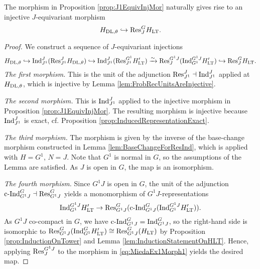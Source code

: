 \documentclass[../main.tex]{subfiles}
\begin{document}
\begin{lem} \label{lem:JEquivInjMor}
  The morphism in Proposition \ref{prop:J1EquivInjMor} naturally gives rise to
  an injective $J$-equivariant morphism
  \begin{equation*}
    H_{\mathrm{DL},\theta} \hookrightarrow \mathrm{Res}_J^G H_{\mathrm{LT}}.
  \end{equation*}
\begin{proof}
  We construct a sequence of $J$-equivariant injections
  \begin{equation*}
    H_{\mathrm{DL},\theta} \hookrightarrow \mathrm{Ind}_{J^1}^J ( \mathrm{Res}_{J^1}^J H_{\mathrm{DL},\theta}) \hookrightarrow
    \mathrm{Ind}_{J^1}^J (\mathrm{Res}_{J^1}^{G^1} H'_{\mathrm{LT}}) \\ \xrightarrow{\sim} \mathrm{Res}_J^{G^1J}(
    \mathrm{Ind}_{G^1}^{G^1J} H'_{\mathrm{LT}}) 
 \hookrightarrow \mathrm{Res}_J^G H_{\mathrm{LT}}.
  \end{equation*}
  \textit{The first morphism.}
  This is the unit of the adjunction $\mathrm{Res}_{J^1}^J \dashv \mathrm{Ind}_{J^1}^J$ 
  applied at $H_{\mathrm{DL},\theta}$, which is injective by Lemma
  \ref{lem:FrobRecUnitsAreInjective}.

  \textit{The second morphism.}
  This is $\mathrm{Ind}_{J^1}^J$ applied to the injective morphism in Proposition
  \ref{prop:J1EquivInjMor}. The resulting morphism is injective because
  $\mathrm{Ind}_{J^1}^J$ is exact, cf. Proposition
  \ref{prop:InducedRepresentationExact}. 

  \textit{The third morphism.} 
  The morphism is given by the inverse of the base-change morphism constructed in
  Lemma \ref{lem:BaseChangeForResInd}, which is applied with $H = G^1$, $N = J$. 
  Note that $G^1$ is normal in $G$, so the assumptions of the Lemma are
  satisfied. As $J$ is open in $G$, the map is an isomorphism. 
  
  \textit{The fourth morphism.}
  Since $G^1J$ is open in $G$, the unit of the adjunction $\mathrm{c\text{-}Ind}_{G^1J}^G \dashv
  \mathrm{Res}_{G^1J}^G$ yields a monomorphism of $G^1J$-representations 
  \begin{equation}\label{eq:MiedaEx1Morph1}
    \mathrm{Ind}_{G^1}^{G^1J} H_{\mathrm{LT}}' \to \mathrm{Res}_{G^1J}^G
    (\mathrm{c\text{-}Ind}_{G^1J}^G(\mathrm{Ind}_{G^1}^{G^1J} H'_{\mathrm{LT}})).
  \end{equation}
  As $G^1J$ co-compact in $G$, we have $\mathrm{c\text{-}Ind}_{G^1J}^G =
  \mathrm{Ind}_{G^1J}^G$, so the right-hand
  side is isomorphic to $\mathrm{Res}_{G^1J}^G(\mathrm{Ind}_{G^1}^G H'_{\mathrm{LT}}) \cong
  \mathrm{Res}_{G^1J}^G(H_{\mathrm{LT}})$ by Proposition \ref{prop:InductionOnTower} and 
  Lemma \ref{lem:InductionStatementOnHLT}. Hence, applying $\mathrm{Res}_J^{G^1J}$ to the
  morphism in \eqref{eq:MiedaEx1Morph1} yields the desired map.
\end{proof}
\end{lem}
\end{document}
